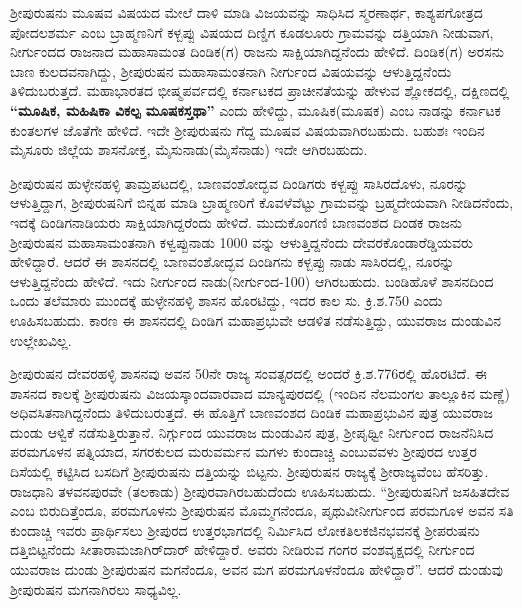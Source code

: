 ಶ‍್ರೀಪುರುಷನು ಮೂಷವ ವಿಷಯದ ಮೇಲೆ ದಾಳಿ ಮಾಡಿ ವಿಜಯವನ್ನು ಸಾಧಿಸಿದ ಸ್ಮರಣಾರ್ಥ, ಕಾಶ್ಯಪಗೋತ್ರದ ಪೋದಲಶರ್ಮ ಎಂಬ ಬ್ರಾಹ್ಮಣನಿಗೆ ಕಳ್ಬಪ್ಪು ವಿಷಯದ ದಿಣ್ಡಿಗ ಕೂಡಲೂರು ಗ್ರಾಮವನ್ನು ದತ್ತಿಯಾಗಿ ನೀಡುವಾಗ, ನೀರ್ಗುಂದದ ರಾಜನಾದ ಮಹಾಸಾಮಂತ ದಿಂಡಿಕ(ಗ) ರಾಜನು ಸಾಕ್ಷಿಯಾಗಿದ್ದನೆಂದು ಹೇಳಿದೆ. ದಿಂಡಿಕ(ಗ) ಅರಸನು ಬಾಣ ಕುಲದವ\-ನಾಗಿದ್ದು, ಶ‍್ರೀಪುರುಷನ ಮಹಾಸಾಮಂತನಾಗಿ ನೀರ್ಗುಂದ ವಿಷಯವನ್ನು ಆಳುತ್ತಿದ್ದನೆಂದು ತಿಳಿದುಬರುತ್ತದೆ. ಮಹಾಭಾರತದ ಭೀಷ್ಮಪರ್ವದಲ್ಲಿ ಕರ್ನಾಟಕದ ಪ್ರಾಚೀನತೆಯನ್ನು ಹೇಳುವ ಶ್ಲೋಕದಲ್ಲಿ, ದಕ್ಷಿಣದಲ್ಲಿ\textbf{ “ಮೂಷಿಕ, ಮಹಿಷಿಕಾ ವಿಕಲ್ಪ ಮೂಷಕಸ್ತಥಾ” }ಎಂದು ಹೇಳಿದ್ದು, ಮೂಷಿಕ(ಮೂಷಕ) ಎಂಬ ನಾಡನ್ನು ಕರ್ನಾಟಕ ಕುಂತಲಗಳ ಜೊತೆಗೇ ಹೇಳಿದೆ. ಇದೇ ಶ‍್ರೀಪುರುಷನು ಗೆದ್ದ ಮೂಷವ ವಿಷಯವಾಗಿರಬಹುದು. ಬಹುಶಃ ಇಂದಿನ ಮೈಸೂರು ಜಿಲ್ಲೆಯ ಶಾಸನೋಕ್ತ, ಮೈಸುನಾಡು(ಮೈಸೆನಾಡು) ಇದೇ ಆಗಿರಬಹುದು.

ಶ‍್ರೀಪುರುಷನ ಹುಳ್ಳೇನಹಳ್ಳಿ ತಾಮ್ರಪಟದಲ್ಲಿ, ಬಾಣವಂಶೋದ್ಭವ ದಿಂಡಿಗರು ಕಳ್ಬಪ್ಪು ಸಾಸಿರದೊಳು, ನೂರನ್ನು ಆಳುತ್ತಿದ್ದಾಗ, ಶ‍್ರೀಪುರುಷನಿಗೆ ಬಿನ್ನಹ ಮಾಡಿ ಬ್ರಾಹ್ಮಣರಿಗೆ ಕೊವಳೆವೆಟ್ಟು ಗ್ರಾಮವನ್ನು ಬ್ರಹ್ಮದೇಯವಾಗಿ ನೀಡಿದನೆಂದು, ಇದಕ್ಕೆ ದಿಂಡಿಗನಾಡಿಯರು ಸಾಕ್ಷಿಯಾಗಿದ್ದರೆಂದು ಹೇಳಿದೆ. ಮುದುಕೊಂಗಣಿ ಬಾಣವಂಶದ ದಿಂಡಕ ರಾಜನು ಶ‍್ರೀಪುರುಷನ ಮಹಾಸಾಮಂತನಾಗಿ ಕಳ್ವಪ್ಪುನಾಡು 1000 ವನ್ನು ಆಳುತ್ತಿದ್ದನೆಂದು ದೇವರಕೊಂಡಾರೆಡ್ಡಿಯವರು ಹೇಳಿದ್ದಾರೆ. ಆದರೆ ಈ ಶಾಸನದಲ್ಲಿ ಬಾಣವಂಶೋದ್ಭವ ದಿಂಡಿಗನು ಕಳ್ಬಪ್ಪು ನಾಡು ಸಾಸಿರದಲ್ಲಿ, ನೂರನ್ನು ಆಳುತ್ತಿದ್ದನೆಂದು ಹೇಳಿದೆ. ಇದು ನೀರ್ಗುಂದ ನಾಡು(ನೀರ್ಗುಂದ-100) ಆಗಿರಬಹುದು. ಬಂಡಿಹೊಳೆ ಶಾಸನದಿಂದ ಒಂದು ತಲೆಮಾರು ಮುಂದಕ್ಕೆ ಹುಳ್ಳೇನಹಳ್ಳಿ ಶಾಸನ ಹೊರಟಿದ್ದು, ಇದರ ಕಾಲ ಸು. ಕ್ರಿ.ಶ.750 ಎಂದು ಊಹಿಸಬಹುದು. ಕಾರಣ ಈ ಶಾಸನದಲ್ಲಿ ದಿಂಡಿಗ ಮಹಾಪ್ರಭುವೇ ಆಡಳಿತ ನಡೆಸುತ್ತಿದ್ದು, ಯುವರಾಜ ದುಂಡುವಿನ ಉಲ್ಲೇಖವಿಲ್ಲ.

\newpage

ಶ‍್ರೀಪುರುಷನ ದೇವರಹಳ್ಳಿ ಶಾಸನವು ಅವನ 50ನೇ ರಾಜ್ಯ ಸಂವತ್ಸರದಲ್ಲಿ ಅಂದರೆ ಕ್ರಿ.ಶ.776ರಲ್ಲಿ ಹೊರಟಿದೆ. ಈ ಶಾಸನದ ಕಾಲಕ್ಕೆ ಶ‍್ರೀಪುರುಷನು ವಿಜಯಸ್ಕಾಂದವಾರವಾದ ಮಾನ್ಯಪುರದಲ್ಲಿ (ಇಂದಿನ ನೆಲಮಂಗಲ ತಾಲ್ಲೂಕಿನ ಮಣ್ಣೆ) ಅಧಿವಸಿತನಾಗಿದ್ದನೆಂದು ತಿಳಿದುಬರುತ್ತದೆ. ಈ ಹೊತ್ತಿಗೆ ಬಾಣವಂಶದ ದಿಂಡಿಕ ಮಹಾಪ್ರಭುವಿನ ಪುತ್ರ ಯುವರಾಜ ದುಂಡು ಆಳ್ವಿಕೆ ನಡೆಸುತ್ತಿರುತ್ತಾನೆ. ನಿರ್ಗ್ಗುಂದ ಯುವರಾಜ ದುಂಡುವಿನ ಪುತ್ರ, ಶ‍್ರೀಪೃಥ್ವೀ ನೀರ್ಗುಂದ ರಾಜನೆನಿಸಿದ ಪರಮಗೂಳನ ಪತ್ನಿಯಾದ, ಸಗರಕುಲದ ಮರುವರ್ಮನ ಮಗಳು ಕುಂದಾಚ್ಚಿ ಎಂಬುವವಳು ಶ‍್ರೀಪುರದ ಉತ್ತರ ದಿಸೆಯಲ್ಲಿ ಕಟ್ಟಿಸಿದ ಬಸದಿಗೆ ಶ‍್ರೀಪುರುಷನು ದತ್ತಿಯನ್ನು ಬಿಟ್ಟನು. ಶ‍್ರೀಪುರುಷನ ರಾಜ್ಯಕ್ಕೆ ಶ‍್ರೀರಾಜ್ಯವೆಂಬ ಹೆಸರಿತ್ತು. ರಾಜಧಾನಿ ತಳವನಪುರವೇ (ತಲಕಾಡು) ಶ‍್ರೀಪುರವಾಗಿರಬಹುದೆಂದು ಊಹಿಸಬಹುದು. “ಶ‍್ರೀಪುರುಷನಿಗೆ ಜಸಹಿತದೇವ ಎಂಬ ಬಿರುದಿತ್ತೆಂದೂ, ಪರಮಗೂಳನು ಶ‍್ರೀಪುರುಷನ ಮೊಮ್ಮಗನೆಂದೂ, ಪೃಥುವೀನೀರ್ಗುಂದ ಪರಮಗೂಳ ಅವನ ಸತಿ ಕುಂದಾಚ್ಚಿ ಇವರು ಪ್ರಾರ್ಥಿಸಲು ಶ‍್ರೀಪುರದ ಉತ್ತರಭಾಗದಲ್ಲಿ ನಿರ್ಮಿಸಿದ ಲೋಕತಿಲಕಜಿನಭವನಕ್ಕೆ ಶ‍್ರೀಪರುಷನು ದತ್ತಿಬಿಟ್ಟನೆಂದು ಸೀತಾರಾಮ\-ಜಾಗಿರ್​ದಾರ್​ ಹೇಳಿದ್ದಾರೆ. ಅವರು ನೀಡಿರುವ ಗಂಗರ ವಂಶವೃಕ್ಷದಲ್ಲಿ ನೀರ್ಗುಂದ ಯುವರಾಜ ದುಂಡು ಶ‍್ರೀಪುರುಷನ ಮಗನೆಂದೂ, ಅವನ ಮಗ ಪರಮಗೂಳನೆಂದೂ ಹೇಳಿದ್ದಾರೆ”. ಆದರೆ ದುಂಡುವು ಶ‍್ರೀಪುರುಷನ ಮಗನಾಗಿರಲು ಸಾಧ್ಯವಿಲ್ಲ.

